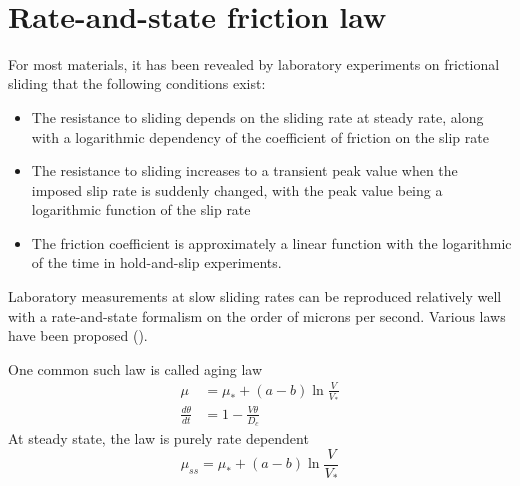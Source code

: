 ~\\


\section{Rate-and-state friction law}

For most materials, it has been revealed by laboratory experiments on frictional sliding that the following conditions exist:

\begin{itemize}
    \item The resistance to sliding depends on the sliding rate at steady rate, along with a logarithmic dependency of the coefficient of friction on the slip rate
    \item The resistance to sliding increases to a transient peak value when the imposed slip rate is suddenly changed, with the peak value being a logarithmic function of the slip rate
    \item The friction coefficient is approximately a linear function with the logarithmic of the time in hold-and-slip experiments.
\end{itemize}

Laboratory measurements at slow sliding rates can be reproduced relatively well with a rate-and-state formalism on the order of microns per second.
Various laws have been proposed (\cite{https://doi.org/10.1029/JB084iB05p02161, https://doi.org/10.1029/JB084iB05p02169,https://doi.org/10.1029/JB088iB12p10359,annurev:/content/journals/10.1146/annurev.earth.26.1.643}).

One common such law is called aging law
\begin{align}
    \mu &= \mu_* + (a - b) \ln \frac{V}{V_*} \\
    \frac{d\theta}{dt} &= 1 - \frac{V\theta}{D_c}
\end{align}
At steady state, the law is purely rate dependent
\begin{equation}
    \mu_{ss} = \mu_{*} + (a - b) \ln \frac{V}{V_*}
\end{equation}

